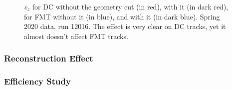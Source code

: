         \begin{figure}[h!]
            \centering{}
            \caption[$v_z$ for DC and FMT, w/ and w/out the geometry cut, run 12016]{$v_z$ for DC without the geometry cut (in red), with it (in dark red), for FMT without it (in blue), and with it (in dark blue). Spring 2020 data, run 12016. The effect is very clear on DC tracks, yet it almost doesn't affect FMT tracks.}
            \label{fig::vz_012016_geomcut}
        \end{figure}

    \subsubsection{Reconstruction Effect}

    \subsubsection{Efficiency Study}
